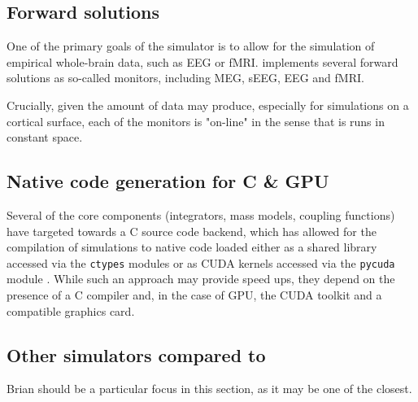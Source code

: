 
\subsection{Forward solutions}

	One of the primary goals of the \TVB simulator is to allow for the
	simulation of empirical whole-brain data, such as EEG or fMRI.
	\TVB implements several forward solutions as so-called monitors, 
	including MEG, sEEG, EEG and fMRI. 

	Crucially, given the amount of data \TVB may produce, especially for
	simulations on a cortical surface, each of the monitors is "on-line"
	in the sense that is runs in constant space.

\subsection{Native code generation for C \& GPU}

	Several of the core components (integrators, mass models, coupling
	functions) have targeted towards a C source code backend, which has
	allowed for the compilation of simulations to native code loaded 
	either as a shared library accessed via the \texttt{ctypes} modules
	or as CUDA kernels accessed via the \texttt{pycuda} module \cite{pycuda}.
	While such an approach may provide speed ups, they depend on the
	presence of a C compiler and, in the case of GPU, the CUDA toolkit and
	a compatible graphics card. 



\subsection{Other simulators compared to \TVB}

	Brian should be a particular focus in this section, as it may
	be one of the closest. 

